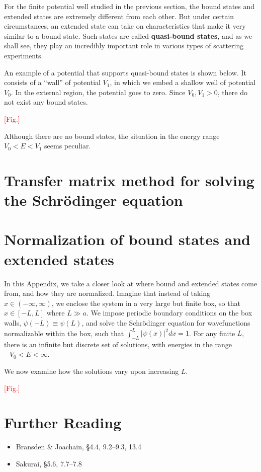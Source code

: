 \documentclass[pra,11pt]{revtex4}
\begin{document}
For the finite potential well studied in the previous section, the
bound states and extended states are extremely different from each
other.  But under certain circumstances, an extended state can take on
characteristics that make it very similar to a bound state.  Such
states are called \textbf{quasi-bound states}, and as we shall see,
they play an incredibly important role in various types of scattering
experiments.

An example of a potential that supports quasi-bound states is shown
below.  It consists of a ``wall'' of potential $V_1$, in which we
embed a shallow well of potential $V_0$.  In the external region, the
potential goes to zero.  Since $V_0, V_1 > 0$, there do not exist any
bound states.

\textcolor{red}{[Fig.]}

Although there are no bound states, the situation in the energy range
$V_0 < E < V_1$ seems peculiar.






\appendix
\section{Transfer matrix method for solving the Schr\"odinger equation}


\section{Normalization of bound states and extended states}

In this Appendix, we take a closer look at where bound and extended
states come from, and how they are normalized.  Imagine that instead
of taking $x \in (-\infty,\infty)$, we enclose the system in a very
large but finite box, so that $x \in [-L,L]$ where $L \gg a$.  We
impose periodic boundary conditions on the box walls, $\psi(-L) \equiv
\psi(L)$, and solve the Schr\"odinger equation for wavefunctions
normalizable within the box, such that $\int_{-L}^{L} |\psi(x)|^2 dx =
1$.  For any finite $L$, there is an infinite but discrete set of
solutions, with energies in the range $-V_0 <E < \infty$.

We now examine how the solutions vary upon increasing $L$.

\textcolor{red}{[Fig.]}





\section{Further Reading}

\begin{itemize}
\item Bransden \& Joachain, \S4.4, 9.2--9.3, 13.4
\item Sakurai, \S5.6, 7.7--7.8

\end{itemize}
\end{document}
